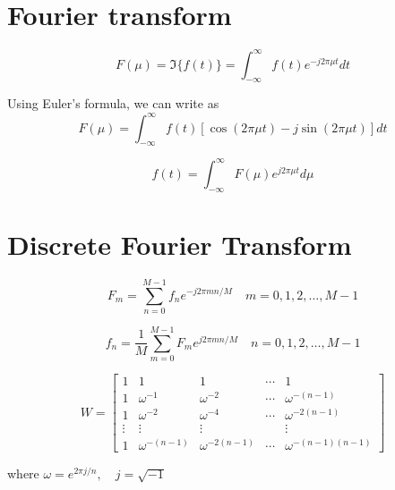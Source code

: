 \section{Fourier transform}

\begin{definition}
    $$F(\mu) = \Im\{f(t)\}=\int_{-\infty}^{\infty} f(t) e^{-j 2 \pi \mu t} d t $$

    Using Euler's formula, we can write as
$$
F(\mu)=\int_{-\infty}^{\infty} f(t)[\cos (2 \pi \mu t)-j \sin (2 \pi \mu t)] d t
$$
\end{definition}

\begin{definition}
    $$ f(t)=\int_{-\infty}^{\infty} F(\mu) e^{j 2 \pi \mu t} d \mu $$
\end{definition}


\section{Discrete Fourier Transform}

\begin{definition}
    $$ F_{m}=\sum_{n=0}^{M-1} f_{n} e^{-j 2 \pi m n / M} \quad m=0,1,2, \ldots, M-1 $$
\end{definition}

\begin{definition}
    $$ f_{n}=\frac{1}{M} \sum_{m=0}^{M-1} F_{m} e^{j 2 \pi m n / M} \quad n=0,1,2, \ldots, M-1 $$
\end{definition}

\begin{definition}[离散傅里叶变换矩阵$W$]
    $$ W=\left[\begin{array}{ccccc}1 & 1 & 1 & \cdots & 1 \\ 1 & \omega^{-1} & \omega^{-2} & \cdots & \omega^{-(n-1)} \\ 1 & \omega^{-2} & \omega^{-4} & \cdots & \omega^{-2(n-1)} \\ \vdots & \vdots & \vdots & & \vdots \\ 1 & \omega^{-(n-1)} & \omega^{-2(n-1)} & \cdots & \omega^{-(n-1)(n-1)}\end{array}\right] $$

    where $ \omega=e^{2 \pi j / n}, \quad j=\sqrt{-1} $
\end{definition}

